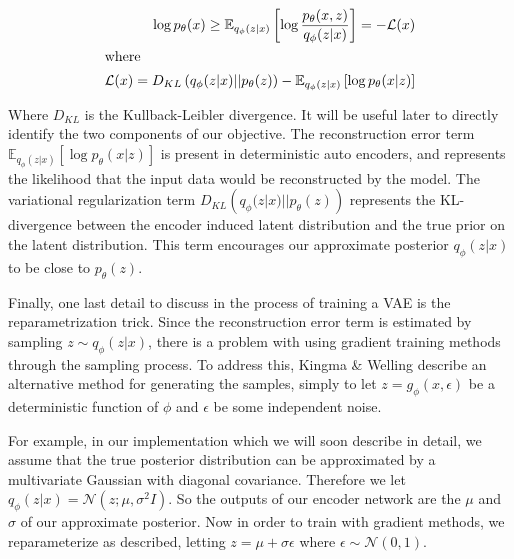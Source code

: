 \documentclass{article} %
\renewcommand{\L}{\mathcal{L}}
\begin{document}
\begin{align}
\log p_\theta(x)\geq \mathbb{E}_{q_\phi(z|x)}\left[\log\frac{p_\theta(x,z)}{q_\phi(z|x)}\right]=-\L(x)\\
\intertext{where}
  \L(x)=D_{KL}\left(q_\phi(z|x)||p_\theta(z)\right)-\mathbb{E}_{q_\phi(z|x)}\left[\log{p_\theta(x|z)}\right]
  \label{eq:VAEOBJECTIVE}
\end{align}
 
 Where $D_{KL}$ is the Kullback-Leibler divergence. It will be useful later to directly identify the two components of our objective. The reconstruction error term $\mathbb{E}_{q_\phi(z|x)}\left[\log{p_\theta(x|z)}\right]$ is present in deterministic auto encoders, and represents the likelihood that the input data would be reconstructed by the model. The variational regularization term $D_{KL}\left(q_\phi(z|x)||p_\theta(z)\right)$ represents the KL-divergence between the encoder induced latent distribution and the true prior on the latent distribution. This term encourages our approximate posterior $q_\phi(z|x)$ to be close to $p_\theta(z)$.
\par Finally, one last detail to discuss in the process of training a VAE is the reparametrization trick. Since the reconstruction error term is estimated by sampling $z\sim q_\phi(z|x)$, there is a problem with using gradient training methods through the sampling process. To address this, Kingma \& Welling describe an alternative method for generating the samples, simply to let $z=g_\phi(x,\epsilon)$ be a deterministic function of $\phi$ and $\epsilon$ be some independent noise.
\par For example, in our implementation which we will soon describe in detail, we assume that the true posterior distribution can be approximated by a multivariate Gaussian with diagonal covariance. Therefore we let $q_\phi(z|x)=\mathcal{N}(z;\mu,\sigma^2 I)$. So the outputs of our encoder network are the $\mu$ and $\sigma$ of our approximate posterior. Now in order to train with gradient methods, we reparameterize as described, letting $z=\mu + \sigma\epsilon$ where $\epsilon \sim \mathcal{N}(0,1)$.

\end{document}
